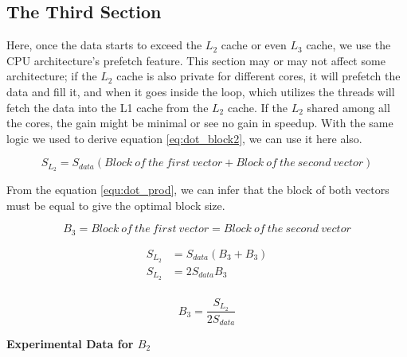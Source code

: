 \subsection{The Third Section}

Here, once the data starts to exceed the $L_2$ cache or even $L_3$ cache, 
we use the CPU architecture's prefetch feature. 
This section may or may not affect some architecture; 
if the $L_2$ cache is also private for different cores, 
it will prefetch the data and fill it, and when it goes 
inside the loop, which utilizes the threads will fetch 
the data into the L1 cache from the $L_2$ cache. 
If the $L_2$ shared among all the cores, the gain might be 
minimal or see no gain in speedup. With the same logic 
we used to derive equation \ref{eq:dot_block2}, we can use it here also.

\[S_{L_2} = S_{data}(Block\ of\ the\ first\ vector + Block\ of\ the\ second\ vector)\]

From the equation \ref{equ:dot_prod}, we can infer that the block of both vectors must
be equal to give the optimal block size.

\[B_3 = Block\ of\ the\ first\ vector = Block\ of\ the\ second\ vector\]

\begin{align*}
    S_{L_2} &= S_{data}(B_3 + B_3)\\
    S_{L_2} &= 2S_{data}B_3\\
\end{align*}

\begin{equation}
    B_3 = \frac{S_{L_2}}{2S_{data}}
    \label{eq:dot_block3}
\end{equation}

\newpage
\textbf{Experimental Data for $B_2$}

\begin{figure}[htb]
    \centering
    \label{fig:dot_Stuning_block3}
    \qquad
    \label{fig:dot_Dtuning_block3}
\end{figure}

